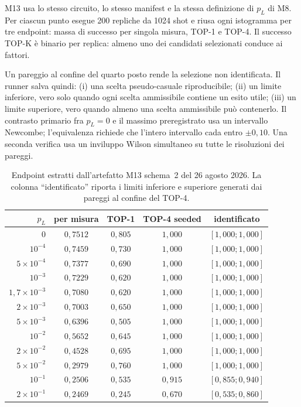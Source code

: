 \begin{onehalfspace}
M13 usa lo stesso circuito, lo stesso manifest e la stessa definizione di $p_L$ di M8. Per ciascun punto esegue 200 repliche da 1024 shot e riusa ogni istogramma per tre endpoint: massa di successo per singola misura, TOP-1 e TOP-4. Il successo TOP-K \`e binario per replica: almeno uno dei candidati selezionati conduce ai fattori.

Un pareggio al confine del quarto posto rende la selezione non identificata. Il runner salva quindi: (i) una scelta pseudo-casuale riproducibile; (ii) un limite inferiore, vero solo quando ogni scelta ammissibile contiene un esito utile; (iii) un limite superiore, vero quando almeno una scelta ammissibile pu\`o contenerlo. Il contrasto primario fra $p_L=0$ e il massimo preregistrato usa un intervallo Newcombe; l'equivalenza richiede che l'intero intervallo cada entro $\pm0,10$. Una seconda verifica usa un inviluppo Wilson simultaneo su tutte le risoluzioni dei pareggi.

\begin{table}[H]

\centering
\small
\begin{tabular}{rcccc}
\toprule
$p_L$ & per misura & TOP-1 & TOP-4 seeded & identificato \\
\midrule
$0$ & $0{,}7512$ & $0{,}805$ & $1{,}000$ & $[1{,}000;1{,}000]$ \\
\addlinespace[0.3em]
$10^{-4}$ & $0{,}7459$ & $0{,}730$ & $1{,}000$ & $[1{,}000;1{,}000]$ \\
\addlinespace[0.3em]
$5\times10^{-4}$ & $0{,}7377$ & $0{,}690$ & $1{,}000$ & $[1{,}000;1{,}000]$ \\
\addlinespace[0.3em]
$10^{-3}$ & $0{,}7229$ & $0{,}620$ & $1{,}000$ & $[1{,}000;1{,}000]$ \\
\addlinespace[0.3em]
$1{,}7\times10^{-3}$ & $0{,}7080$ & $0{,}620$ & $1{,}000$ & $[1{,}000;1{,}000]$ \\
\addlinespace[0.3em]
$2\times10^{-3}$ & $0{,}7003$ & $0{,}650$ & $1{,}000$ & $[1{,}000;1{,}000]$ \\
\addlinespace[0.3em]
$5\times10^{-3}$ & $0{,}6396$ & $0{,}505$ & $1{,}000$ & $[1{,}000;1{,}000]$ \\
\addlinespace[0.3em]
$10^{-2}$ & $0{,}5652$ & $0{,}645$ & $1{,}000$ & $[1{,}000;1{,}000]$ \\
\addlinespace[0.3em]
$2\times10^{-2}$ & $0{,}4528$ & $0{,}695$ & $1{,}000$ & $[1{,}000;1{,}000]$ \\
\addlinespace[0.3em]
$5\times10^{-2}$ & $0{,}2979$ & $0{,}760$ & $1{,}000$ & $[1{,}000;1{,}000]$ \\
\addlinespace[0.3em]
$10^{-1}$ & $0{,}2506$ & $0{,}535$ & $0{,}915$ & $[0{,}855;0{,}940]$ \\
\addlinespace[0.3em]
$2\times10^{-1}$ & $0{,}2469$ & $0{,}245$ & $0{,}670$ & $[0{,}535;0{,}860]$ \\
\bottomrule
\end{tabular}
\caption[Endpoint preregistrati di M13]{Endpoint estratti dall'artefatto M13 schema~2 del 26 agosto 2026. La colonna ``identificato'' riporta i limiti inferiore e superiore generati dai pareggi al confine del TOP-4.}\label{tab:app_comp_topk}


\end{table}
\end{onehalfspace}
